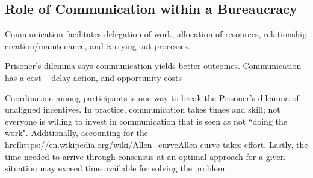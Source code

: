 \subsection{Role of Communication within a Bureaucracy}

Communication facilitates delegation of work, allocation of resources, relationship creation/maintenance, and carrying out processes.



Prisoner's dilemma says communication yields better outcomes.
Communication has a cost -- delay action, and opportunity costs


Coordination among participants is one way to break the \href{https://en.wikipedia.org/wiki/Prisoner\%27s\_dilemma}{Prisoner's dilemma} of unaligned incentives. In practice, communication takes times and skill; not everyone is willing to invest in communication that is seen as not ``doing the work". Additionally, accounting for the \\href{https://en.wikipedia.org/wiki/Allen\_curve}{Allen curve} takes effort. Lastly, the time needed to arrive through consensus at an optimal approach for a given situation may exceed time available for solving the problem.
 